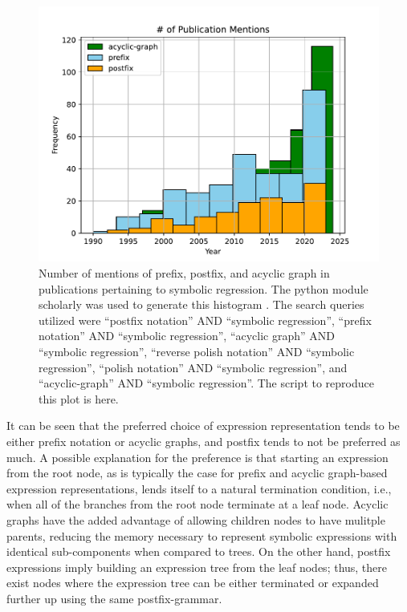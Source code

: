 \documentclass[12pt]{iopart}
\begin{document}
\begin{figure}
    \centering
    \includegraphics[width=\linewidth]{pub_freqs.pdf}
    \caption{Number of mentions of prefix, postfix, and acyclic graph in publications pertaining to symbolic regression. The python module scholarly was used to generate this histogram \cite{cholewiak2021scholarly}. The search queries utilized were ``postfix notation'' AND ``symbolic regression'', ``prefix notation'' AND ``symbolic regression'', ``acyclic graph'' AND ``symbolic regression'', ``reverse polish notation'' AND ``symbolic regression'', ``polish notation'' AND ``symbolic regression'', and ``acyclic-graph'' AND ``symbolic regression''. The script to reproduce this plot is here.} %
    \label{fig:pub_freqs_pre_post_acyc_graph}
\end{figure}

It can be seen that the preferred choice of expression representation tends to be either prefix notation or acyclic graphs, and postfix tends to not be preferred as much. A possible explanation for the preference is that starting an expression from the root node, as is typically the case for prefix and acyclic graph-based expression representations, lends itself to a natural termination condition, i.e., when all of the branches from the root node terminate at a leaf node. Acyclic graphs have the added advantage of allowing children nodes to have mulitple parents, reducing the memory necessary to represent symbolic expressions with identical sub-components when compared to trees. On the other hand, postfix expressions imply building an expression tree from the leaf nodes; thus, there exist nodes where the expression tree can be either terminated or expanded further up using the same postfix-grammar. 
\end{document}
